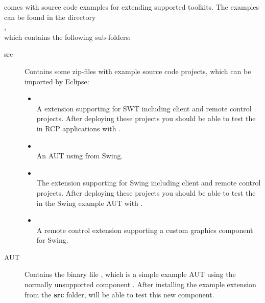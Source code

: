 \app{} comes with source code examples for extending supported toolkits. The
examples can be found in the directory\\
,\\
which contains the following sub-folders:

\begin{description}
 \item[src] Contains some zip-files with example source code projects, which
            can be imported by Eclipse:
 \begin{itemize}
   \item {}\\
         A \app{} extension supporting  for SWT including client
         and remote control projects. After deploying these projects you should
         be able to test the  in RCP applications with \app{}.
   \item {}\\
         An AUT using  from Swing.
   \item {}\\
         The \app{} extension supporting  for Swing including
         client and remote control projects. After deploying these projects you
         should be able to test the  in the Swing example AUT
         with \app{}.
   \item {}\\
         A remote control extension supporting a custom graphics
         component for Swing.
 \end{itemize}
 \item[AUT]  Contains the binary file , which is a simple
 example AUT using the normally unsupported component . After
 installing the  example extension from the \textbf{src}
 folder, \app{} will be able to test this new component.
\end{description}
